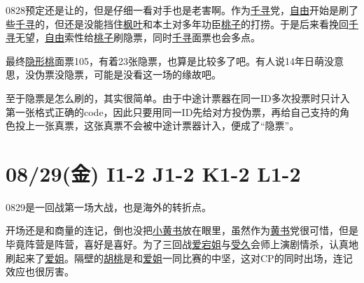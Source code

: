 0828预定还是让的，但是仔细一看对手也是老害啊。作为\uline{千寻}党，\uline{自由}开始是刷了些\uline{千寻}的，但还是没能挡住\uline{枫叶}和本土对多年功臣\uline{桃子}的打捞。于是后来看挽回\uline{千寻}无望，\uline{自由}索性给\uline{桃子}刷隐票，同时\uline{千寻}面票也会多点。

最终\uline{隐形桃}面票105，有着23张隐票，也算是比较多了吧。有人说14年日萌没意思，没伪票没隐票，可能是没看这一场的缘故吧。

至于隐票是怎么刷的，其实很简单。由于中途计票器在同一ID多次投票时只计入第一张格式正确的code，因此只要用同一ID先给对方投伪票，再给自己支持的角色投上一张真票，这张真票不会被中途计票器计入，便成了“隐票”。

\section{08/29(金) I1-2 J1-2 K1-2 L1-2}



0829是一回战第一场大战，也是海外的转折点。

开场还是和商量的连记，倒也没把\uline{小黄书}放在眼里，虽然作为\uline{黄书}党很可惜，但是毕竟阵营是阵营，喜好是喜好。为了三回战\uline{爱宕姐}与\uline{受久}会师上演剧情杀，认真地刷起来了\uline{爱姐}。隔壁的\uline{胡桃}是和\uline{爱姐}一同比赛的中坚，这对CP的同时出场，连记效应也很厉害。

